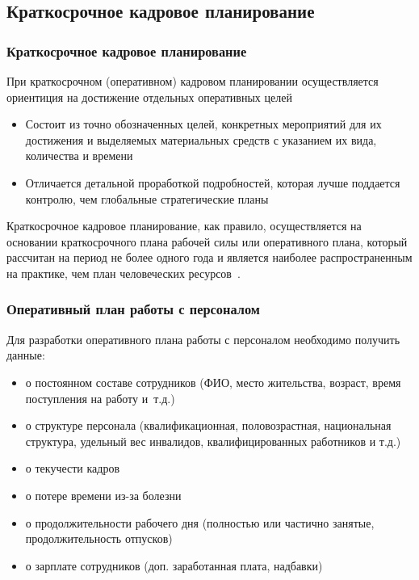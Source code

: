 \documentclass{../industrial-development}
\begin{document}
\subsection{Краткосрочное кадровое планирование}
\begin{frame} \frametitle{Краткосрочное кадровое планирование}
При краткосрочном (оперативном) кадровом планировании осуществляется ориентиция на достижение отдельных оперативных целей
  \begin{itemize}

\item Состоит из точно обозначенных целей, конкретных мероприятий для их достижения и выделяемых материальных средств с указанием их вида, количества и времени
\item Отличается детальной проработкой подробностей, которая лучше поддается контролю, чем глобальные стратегические планы
  \end{itemize}
\end{frame}

\lecturenotes

\alert{Краткосрочное кадровое планирование}, как правило, осуществляется на основании краткосрочного плана рабочей силы или оперативного плана, который рассчитан на период не более одного года и является наиболее распространенным на практике, чем
план человеческих ресурсов~\cite[с.~87]{Ivanova}.

\begin{frame} \frametitle{Оперативный план работы с персоналом}
Для разработки оперативного плана работы с персоналом необходимо получить данные:
  \begin{itemize}
\item	о постоянном составе сотрудников (ФИО, место жительства, возраст, время поступления на работу и~т.д.)
\item	о структуре персонала (квалификационная, половозрастная, национальная структура, удельный вес инвалидов, квалифицированных работников и т.д.)
\item	о текучести кадров
\item	о потере времени из-за болезни
\item	о продолжительности рабочего дня (полностью или частично занятые, продолжительность отпусков)
\item	о зарплате сотрудников (доп. заработанная плата, надбавки)
	  \end{itemize}

\end{frame}

\lecturenotes
\end{document}
